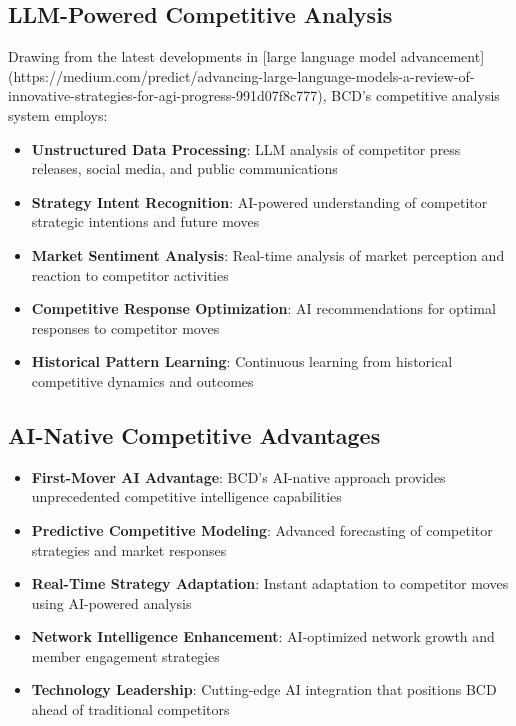 \documentclass[12pt,a4paper]{book}
\begin{document}
\subsection{LLM-Powered Competitive Analysis}

Drawing from the latest developments in [large language model advancement](https://medium.com/predict/advancing-large-language-models-a-review-of-innovative-strategies-for-agi-progress-991d07f8c777), BCD's competitive analysis system employs:

\begin{itemize}
    \item \textbf{Unstructured Data Processing}: LLM analysis of competitor press releases, social media, and public communications
    \item \textbf{Strategy Intent Recognition}: AI-powered understanding of competitor strategic intentions and future moves
    \item \textbf{Market Sentiment Analysis}: Real-time analysis of market perception and reaction to competitor activities
    \item \textbf{Competitive Response Optimization}: AI recommendations for optimal responses to competitor moves
    \item \textbf{Historical Pattern Learning}: Continuous learning from historical competitive dynamics and outcomes
\end{itemize}

\subsection{AI-Native Competitive Advantages}

\begin{itemize}
    \item \textbf{First-Mover AI Advantage}: BCD's AI-native approach provides unprecedented competitive intelligence capabilities
    \item \textbf{Predictive Competitive Modeling}: Advanced forecasting of competitor strategies and market responses
    \item \textbf{Real-Time Strategy Adaptation}: Instant adaptation to competitor moves using AI-powered analysis
    \item \textbf{Network Intelligence Enhancement}: AI-optimized network growth and member engagement strategies
    \item \textbf{Technology Leadership}: Cutting-edge AI integration that positions BCD ahead of traditional competitors
\end{itemize}
\end{document}
